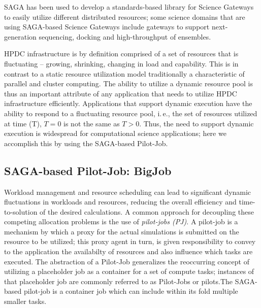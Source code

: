 \documentclass{sig-alternate}
\begin{document}
SAGA has been used to develop a standards-based library for Science
Gateways to easily utilize different distributed resources; some
science domains that are using SAGA-based Science Gateways include
gateways to support next-generation sequencing, docking and
high-throughput of ensembles.

HPDC infrastructure is by definition comprised of a set of resources
that is fluctuating -- growing, shrinking, changing in load and
capability. This is in contrast to a static resource utilization model
traditionally a characteristic of parallel and cluster computing. The
ability to utilize a dynamic resource pool is thus an important
attribute of any application that needs to utilize HPDC infrastructure
efficiently. Applications that support dynamic execution have the
ability to respond to a fluctuating resource pool, i.\,e., the set of
resources utilized at time (T), $T=0$ is not the same as $T>0$.  Thus,
the need to support dynamic execution is widespread for computational
science applications; here we accomplish this by using the SAGA-based
Pilot-Job.

\subsection{SAGA-based Pilot-Job: BigJob}

  Workload management and resource
scheduling can lead to significant dynamic fluctuations in workloads
and resources, reducing the overall efficiency and time-to-solution of
the desired calculations.  A common approach for decoupling these
competing allocation problems is the use of \emph{pilot-jobs (PJ)}.
 A pilot-job is a mechanism by which a proxy
for the actual simulations is submitted on the resource to be
utilized; this proxy agent in turn, is given responsibility to convey
to the application the availabilty of resources and also influence
which tasks are executed. The abstraction of a Pilot-Job generalizes
the reoccurring concept of utilizing a placeholder job as a container
for a set of compute tasks; instances of that placeholder job are
commonly referred to as Pilot-Jobs or pilots.The SAGA-based pilot-job
is a container job which can include within its fold multiple smaller
tasks.
\end{document}
